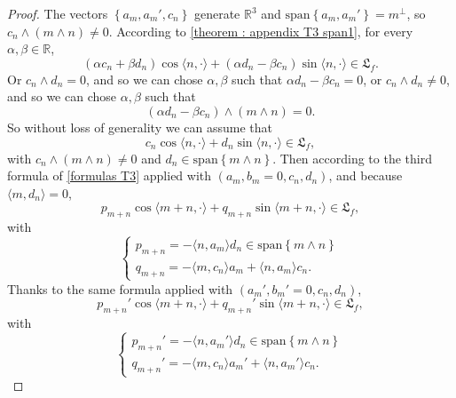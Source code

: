 \documentclass[10pt]{article}
\newcommand{\R}{{\mathbb R}}
\newcommand{\la}{\langle}
\newcommand{\ra}{\rangle}
\newcommand{\we}{\wedge}
\begin{document}
\begin{proof}
     The vectors $\left\{a_m,a_m',c_n\right\}$ generate $\R^3$ and $\mathrm{span}\left\{a_m,a_m'\right\}=m^{\perp}$, so $c_n \we (m\we n)\neq 0$. According to \cref{theorem : appendix T3 span1}, for every $\alpha,\beta \in \R$,
     \begin{equation*}
         (\alpha c_n + \beta d_n)\cos \la n,\cdot \ra + (\alpha d_n - \beta c_n)\sin \la n,\cdot \ra \in \mathfrak{L}_f.
     \end{equation*} Or $c_n\we d_n=0$, and so we can chose $\alpha,\beta$ such that $\alpha d_n -\beta c_n=0$, or $c_n\we d_n \neq 0$, and so we can chose $\alpha,\beta$ such that
     \begin{equation*}
         (\alpha d_n -\beta c_n)\we (m \we n)=0.
     \end{equation*}
     So without loss of generality we can assume that
     \begin{equation}
         c_n \cos \la n,\cdot \ra + d_n \sin \la n,\cdot \ra \in \mathfrak{L}_f,
     \end{equation}
     with $c_n \we (m \we n)\neq 0$ and $d_n \in \mathrm{span} \left\{m \we n\right\}$. Then according to the third formula of \cref{formulas T3} applied with $(a_m,b_m=0,c_n,d_n)$, and because $\la m,d_n\ra=0$,
     \begin{equation*}
         p_{m+n}\cos\la m+n,\cdot\ra +q_{m+n}\sin \la m+n,\cdot \ra \in \mathfrak{L}_f,
     \end{equation*}
     with 
    \begin{equation*}
    \left\{\begin{array}{ll}
         p_{m+n}=-\la n,a_m \ra d_n \in \mathrm{span} \left\{m \we n\right\} \\
        q_{m+n}= -\la m,c_n \ra a_m + \la n,a_m \ra c_n.
    \end{array}\right.  
    \end{equation*}
    Thanks to the same formula applied with $(a_m',b_m'=0,c_n,d_n)$,
    \begin{equation*}
        p_{m+n}'\cos\la m+n,\cdot\ra +q_{m+n}'\sin \la m+n,\cdot \ra \in \mathfrak{L}_f,
    \end{equation*}
    with
     \begin{equation*}
    \left\{\begin{array}{ll}
         p_{m+n}'=-\la n,a_m' \ra d_n \in \mathrm{span} \left\{m \we n\right\} \\
        q_{m+n}'= -\la m,c_n \ra a_m' + \la n,a_m' \ra c_n.
    \end{array}\right.  

\end{equation*}
\end{proof}
\end{document}
